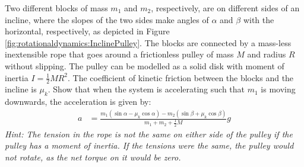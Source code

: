 \question Two different blocks of mass $m_1$ and $m_2$, respectively, are on different sides of an incline, where the slopes of the two sides make angles of $\alpha$ and $\beta$ with the horizontal, respectively, as depicted in Figure \ref{fig:rotationaldynamics:InclinePulley}. The blocks are connected by a mass-less inextensible rope that goes around a frictionless pulley of mass $M$ and radius $R$ without slipping. The pulley can be modelled as a solid disk with moment of inertia $I=\frac{1}{2}MR^2$. The coefficient of kinetic friction between the blocks and the incline is $\mu_k$. Show that when the system is accelerating such that $m_1$ is moving downwards, the acceleration is given by:
\begin{align*}
a &= \frac{m_1(\sin\alpha-\mu_k\cos\alpha)-m_2(\sin\beta+\mu_k\cos\beta)}{m_1+m_2+\frac{1}{2}M}g
\end{align*}
\textit{Hint: The tension in the rope is not the same on either side of the pulley if the pulley has a moment of inertia. If the tensions were the same, the pulley would not rotate, as the net torque on it would be zero.}

